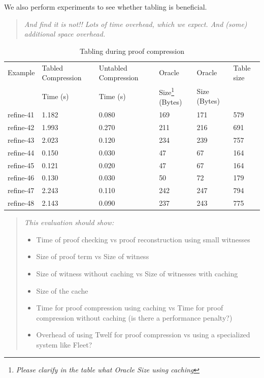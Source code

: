 \documentclass{acmconf}
\newcommand{\ednote}[1]{\footnote{\it #1}}
\newenvironment{note}{\begin{quote}\message{note!}\it}{\end{quote}}
\begin{document}
We also perform experiments to see whether tabling is beneficial.
\begin{note}
And find it is not!! 
Lots of time overhead, which we expect.
And (some) additional space overhead.
\end{note}

\begin{table}[tbp]
\begin{center}
\begin{small}
\begin{tabular}{|l|l|l|l|l|l|}
\hline
Example & Tabled Compression 
& Untabled Compression & Oracle & Oracle & Table size\\
& Time (s) & Time (s) & Size\ednote{Please clarify in the table what Oracle Size using
  caching} (Bytes) & Size (Bytes) &\\
\hline
refine-41 & 1.182 & 0.080 & 169 & 171 & 579\\
refine-42 & 1.993 & 0.270 & 211 & 216 & 691\\
refine-43 & 2.023 & 0.120 & 234 & 239 & 757\\
refine-44 & 0.150 & 0.030 & 47 & 67 & 164\\
refine-45 & 0.121 & 0.020 & 47 & 67 & 164\\
refine-46 & 0.130 & 0.030 & 50 & 72 & 179\\
refine-47 & 2.243 & 0.110 & 242 & 247 & 794\\
refine-48 & 2.143 & 0.090 & 237 & 243 & 775\\
\hline
\end{tabular}
\end{small}
\end{center}
\caption{\label{tab:prooftable} Tabling during proof
  compression}
\end{table}

\begin{note}
This evaluation should show:
\begin{itemize}
\item Time of proof checking vs proof reconstruction using small
  witnesses
\item Size of proof term vs Size of witness 
\item Size of witness without caching vs Size of witnesses with
  caching
\item Size of the cache
\item Time for proof compression using caching vs Time for proof
  compression without caching (is there a performance penalty?)
\item Overhead of using Twelf for proof compression vs using a
  specialized system like Fleet?
\end{itemize}
\end{note}
\end{document}
